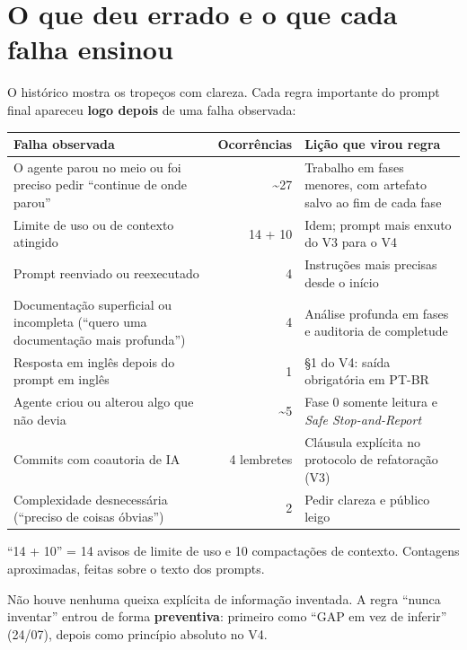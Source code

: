\section{O que deu errado e o que cada falha ensinou}

O histórico mostra os tropeços com clareza. Cada regra importante do prompt final apareceu \textbf{logo depois} de uma falha observada:

\begin{center}
\renewcommand{\arraystretch}{1.45}
\footnotesize
\begin{tabularx}{\linewidth}{@{}>{\raggedright\arraybackslash}X r >{\raggedright\arraybackslash}X@{}}
\toprule
\textbf{Falha observada} & \textbf{Ocorrências} & \textbf{Lição que virou regra} \\
\midrule
O agente parou no meio ou foi preciso pedir \enquote{continue de onde parou} & \textasciitilde27 & Trabalho em fases menores, com artefato salvo ao fim de cada fase \\
Limite de uso ou de contexto atingido & 14 + 10 & Idem; prompt mais enxuto do V3 para o V4 \\
Prompt reenviado ou reexecutado & 4 & Instruções mais precisas desde o início \\
Documentação superficial ou incompleta (\enquote{quero uma documentação mais profunda}) & 4 & Análise profunda em fases e auditoria de completude \\
Resposta em inglês depois do prompt em inglês & 1 & \S1 do V4: saída obrigatória em PT-BR \\
Agente criou ou alterou algo que não devia & \textasciitilde5 & Fase 0 somente leitura e \emph{Safe Stop-and-Report} \\
Commits com coautoria de IA & 4 lembretes & Cláusula explícita no protocolo de refatoração (V3) \\
Complexidade desnecessária (\enquote{preciso de coisas óbvias}) & 2 & Pedir clareza e público leigo \\
\bottomrule
\end{tabularx}
\end{center}
{\footnotesize\color{azulMedio} \enquote{14 + 10} = 14 avisos de limite de uso e 10 compactações de contexto. Contagens aproximadas, feitas sobre o texto dos prompts.}

\begin{dica}
Não houve nenhuma queixa explícita de informação inventada. A regra \enquote{nunca inventar} entrou de forma \textbf{preventiva}: primeiro como \enquote{GAP em vez de inferir} (24/07), depois como princípio absoluto no V4.
\end{dica}

